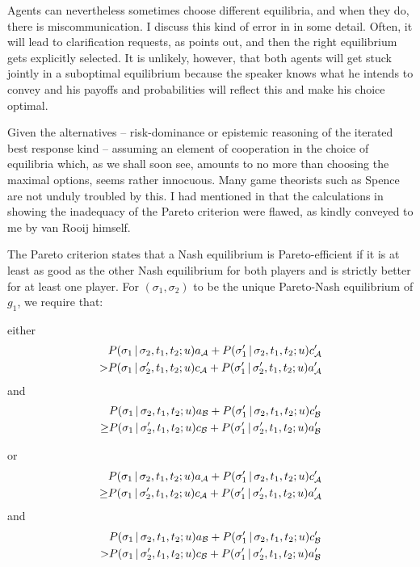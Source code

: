 {Agents can nevertheless sometimes choose different equilibria, and when they do, there is miscommunication. I discuss this kind of error in  in some detail. Often, it will lead to clarification requests, as \citet{benz:eip} points out, and then the right equilibrium gets explicitly selected. It is unlikely, however, that both agents will get stuck jointly in a suboptimal equilibrium because the speaker knows what he intends to convey and his payoffs and probabilities will reflect this and make his choice optimal.

Given the alternatives -- risk-dominance or epistemic reasoning of the iterated best response kind -- assuming an element of cooperation in the choice of equilibria which, as we shall soon see, amounts to no more than choosing the maximal options, seems rather innocuous. Many game theorists such as Spence are not unduly troubled by this. I had mentioned in \citet[108--109]{parikh:pgpi} that the calculations in \citet{vanrooy:sgshs} showing the inadequacy of the Pareto criterion were flawed, as kindly conveyed to me by van Rooij himself. \label{foot:Pareto criterion}} The Pareto criterion states that a Nash equilibrium is Pareto-efficient if it is at least as good as the other Nash equilibrium for both players and is strictly better for at least one player. For $(\sigma_1, \sigma_2)$ to be the unique Pareto-Nash equilibrium of $g_1$, we require that:

\noindent either
\begin{align*}
      & P(\sigma_1 \,|\, \sigma_2, t_1, t_2; u)a_{\cal A} + P(\sigma'_1 \,|\, \sigma_2, t_1, t_2; u)c'_{\cal A}\\
    > & P(\sigma_1 \,|\, \sigma'_2, t_1, t_2; u)c_{\cal A} + P(\sigma'_1 \,|\, \sigma'_2, t_1, t_2; u)a'_{\cal A} 
\end{align*}
and
\begin{align*}
         & P(\sigma_1 \,|\, \sigma_2, t_1, t_2; u)a_{\cal B} + P(\sigma'_1 \,|\, \sigma_2, t_1, t_2; u)c'_{\cal B}\\
    \geq & P(\sigma_1 \,|\, \sigma'_2, t_1, t_2; u)c_{\cal B} + P(\sigma'_1 \,|\, \sigma'_2, t_1, t_2; u)a'_{\cal B} 
\end{align*}

\noindent or
\begin{align*}
         & P(\sigma_1 \,|\, \sigma_2, t_1, t_2; u)a_{\cal A} + P(\sigma'_1 \,|\, \sigma_2, t_1, t_2; u)c'_{\cal A}\\
    \geq &  P(\sigma_1 \,|\, \sigma'_2, t_1, t_2; u)c_{\cal A} + P(\sigma'_1 \,|\, \sigma'_2, t_1, t_2; u)a'_{\cal A}
\end{align*}
and
\begin{align*}
          & P(\sigma_1 \,|\, \sigma_2, t_1, t_2; u)a_{\cal B} + P(\sigma'_1 \,|\, \sigma_2, t_1, t_2; u)c'_{\cal B}\\
        > & P(\sigma_1 \,|\, \sigma'_2, t_1, t_2; u)c_{\cal B} + P(\sigma'_1 \,|\, \sigma'_2, t_1, t_2; u)a'_{\cal B}
\end{align*}

